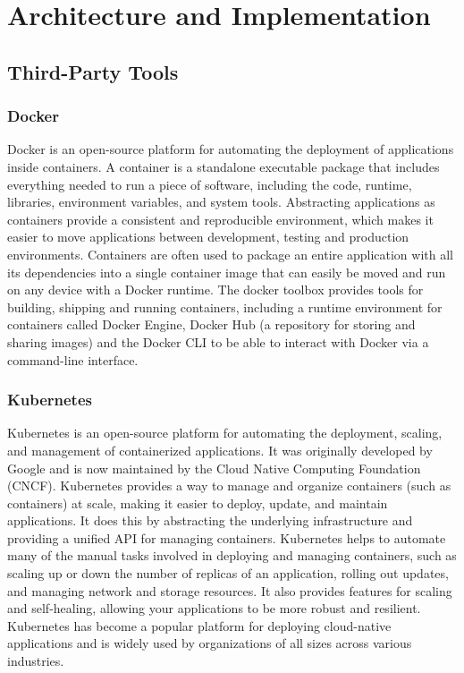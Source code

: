 \chapter{Architecture and Implementation}
\label{ch:architecture-and-implementation}

\section{Third-Party Tools}
\label{sec:third-party-tools-architecture}

\subsection{Docker}
\label{sec:docker-evaluation-setup}

  Docker is an open-source platform for automating the deployment of applications inside containers. A container is a standalone executable package that includes everything needed to run a piece of software, including the code, runtime, libraries, environment variables, and system tools.
  Abstracting applications as containers provide a consistent and reproducible environment, which makes it easier to move applications between development, testing and production environments.
  Containers are often used to package an entire application with all its dependencies into a single container image that can easily be moved and run on any device with a Docker runtime.
  The docker toolbox provides tools for building, shipping and running containers, including a runtime environment for containers called Docker Engine, Docker Hub (a repository for storing and sharing images) and the Docker CLI to be able to interact with Docker via a command-line interface.

\subsection{Kubernetes}
\label{sec:kubernetes-evaluation-setup}
  Kubernetes is an open-source platform for automating the deployment, scaling, and management of containerized applications. It was originally developed by Google and is now maintained by the Cloud Native Computing Foundation (CNCF).
  Kubernetes provides a way to manage and organize containers (such as  containers) at scale, making it easier to deploy, update, and maintain applications. It does this by abstracting the underlying infrastructure and providing a unified API for managing containers.
  Kubernetes helps to automate many of the manual tasks involved in deploying and managing containers, such as scaling up or down the number of replicas of an application, rolling out updates, and managing network and storage resources. It also provides features for scaling and self-healing, allowing your applications to be more robust and resilient.
  Kubernetes has become a popular platform for deploying cloud-native applications and is widely used by organizations of all sizes across various industries.

